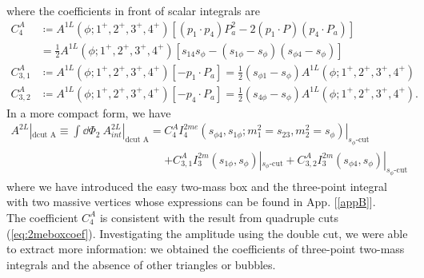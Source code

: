  where the coefficients in front of scalar integrals are
 \begin{align*}
 	C^A_4&\coloneqq A^{1L}(\phi;1^+,2^+,3^+,4^+)\left[(p_1\cdot p_4) P_a^2-2(p_1\cdot P) (p_4 \cdot P_a)\right]\\
	&=\frac{1}{2}A^{1L}(\phi;1^+,2^+,3^+,4^+)\left[s_{14}s_{\phi}-(s_{1\phi}-s_{\phi})(s_{\phi4}-s_\phi)\right]\\
	C^A_{3,1}&\coloneqq A^{1L}(\phi;1^+,2^+,3^+,4^+)\left[-p_1\cdot P_a\right]=\frac{1}{2}(s_{\phi1}-s_\phi)A^{1L}(\phi;1^+,2^+,3^+,4^+)\\
	C^A_{3,2}&\coloneqq A^{1L}(\phi;1^+,2^+,3^+,4^+)\left[-p_4\cdot P_a\right]=\frac{1}{2}(s_{4\phi}-s_\phi)A^{1L}(\phi;1^+,2^+,3^+,4^+).
 \end{align*}
 In a more compact form, we have
 \begin{align*}
 	A^{2L}|_{\text{dcut A}}\equiv\int \dd \Phi_2 \ A^{2L}_{int}|_{\text{dcut A}}=&C^A_4 \left.I_4^{2me}(s_{\phi4},s_{1\phi};m_1^2=s_{23},m_2^2=s_\phi)\right|_{s_{\phi}\text{-cut}}\\
	&+C^A_{3,1}I_3^{2m}(s_{1\phi},s_\phi)|_{s_{\phi}\text{-cut}}+C^A_{3,2}I_3^{2m}(s_{\phi4},s_\phi)|_{s_{\phi}\text{-cut}}
 \end{align*}
where we have introduced the easy two-mass box and the three-point integral with two massive vertices whose expressions can be found in App. [\ref{appB}].\\
The coefficient $C^A_4$ is consistent with the result from quadruple cuts (\ref{eq:2meboxcoef}).
Investigating the amplitude using the double cut, we were able to extract more information: we obtained the coefficients of three-point two-mass integrals and the absence of other triangles or bubbles.
